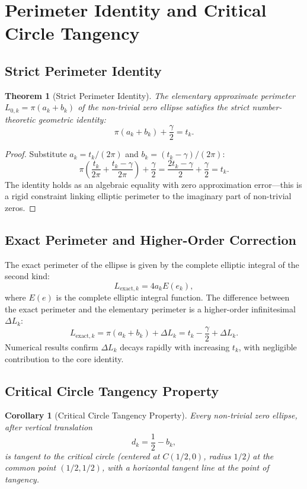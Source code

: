\documentclass[12pt,a4paper]{article}
\newtheorem{theorem}{Theorem}
\newtheorem{corollary}{Corollary}
\theoremstyle{definition}
\begin{document}
\section{Perimeter Identity and Critical Circle Tangency}
\label{sec:perimeter}

\subsection{Strict Perimeter Identity}
\begin{theorem}[Strict Perimeter Identity]
\label{thm:perimeter}
The elementary approximate perimeter $L_{0,k} = \pi(a_k + b_k)$ of the non-trivial zero ellipse satisfies the strict number-theoretic geometric identity:
\[
\boxed{\pi(a_k + b_k) + \frac{\gamma}{2} = t_k.}
\]
\end{theorem}

\begin{proof}
Substitute $a_k = t_k/(2\pi)$ and $b_k = (t_k - \gamma)/(2\pi)$:
\[
\pi\!\left(\frac{t_k}{2\pi} + \frac{t_k - \gamma}{2\pi}\right) + \frac{\gamma}{2}
= \frac{2t_k - \gamma}{2} + \frac{\gamma}{2}
= t_k.
\]
The identity holds as an algebraic equality with zero approximation error---this is a rigid constraint linking elliptic perimeter to the imaginary part of non-trivial zeros.
\end{proof}

\subsection{Exact Perimeter and Higher-Order Correction}
The exact perimeter of the ellipse is given by the complete elliptic integral of the second kind:
\[
L_{\text{exact},k} = 4a_k E(e_k),
\]
where $E(e)$ is the complete elliptic integral function. The difference between the exact perimeter and the elementary perimeter is a higher-order infinitesimal $\Delta L_k$:
\[
L_{\text{exact},k} = \pi(a_k + b_k) + \Delta L_k = t_k - \frac{\gamma}{2} + \Delta L_k.
\]
Numerical results confirm $\Delta L_k$ decays rapidly with increasing $t_k$, with negligible contribution to the core identity.

\subsection{Critical Circle Tangency Property}
\begin{corollary}[Critical Circle Tangency Property]
\label{cor:tangency}
Every non-trivial zero ellipse, after vertical translation
\[
d_k = \frac{1}{2} - b_k,
\]
is tangent to the critical circle (centered at $C(1/2, 0)$, radius $1/2$) at the common point $(1/2, 1/2)$, with a horizontal tangent line at the point of tangency.
\end{corollary}
\end{document}

